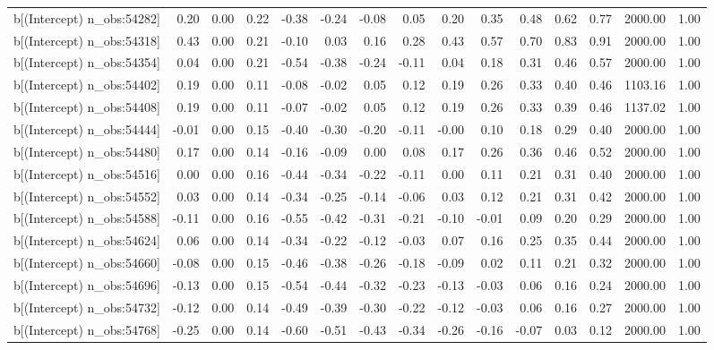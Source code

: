 \begin{table}[ht]
\begin{tabular}{rrrrrrrrrrrrrrr}
  b[(Intercept) n\_obs:54282] & 0.20 & 0.00 & 0.22 & -0.38 & -0.24 & -0.08 & 0.05 & 0.20 & 0.35 & 0.48 & 0.62 & 0.77 & 2000.00 & 1.00 \\ 
  b[(Intercept) n\_obs:54318] & 0.43 & 0.00 & 0.21 & -0.10 & 0.03 & 0.16 & 0.28 & 0.43 & 0.57 & 0.70 & 0.83 & 0.91 & 2000.00 & 1.00 \\ 
  b[(Intercept) n\_obs:54354] & 0.04 & 0.00 & 0.21 & -0.54 & -0.38 & -0.24 & -0.11 & 0.04 & 0.18 & 0.31 & 0.46 & 0.57 & 2000.00 & 1.00 \\ 
  b[(Intercept) n\_obs:54402] & 0.19 & 0.00 & 0.11 & -0.08 & -0.02 & 0.05 & 0.12 & 0.19 & 0.26 & 0.33 & 0.40 & 0.46 & 1103.16 & 1.00 \\ 
  b[(Intercept) n\_obs:54408] & 0.19 & 0.00 & 0.11 & -0.07 & -0.02 & 0.05 & 0.12 & 0.19 & 0.26 & 0.33 & 0.39 & 0.46 & 1137.02 & 1.00 \\ 
  b[(Intercept) n\_obs:54444] & -0.01 & 0.00 & 0.15 & -0.40 & -0.30 & -0.20 & -0.11 & -0.00 & 0.10 & 0.18 & 0.29 & 0.40 & 2000.00 & 1.00 \\ 
  b[(Intercept) n\_obs:54480] & 0.17 & 0.00 & 0.14 & -0.16 & -0.09 & 0.00 & 0.08 & 0.17 & 0.26 & 0.36 & 0.46 & 0.52 & 2000.00 & 1.00 \\ 
  b[(Intercept) n\_obs:54516] & 0.00 & 0.00 & 0.16 & -0.44 & -0.34 & -0.22 & -0.11 & 0.00 & 0.11 & 0.21 & 0.31 & 0.40 & 2000.00 & 1.00 \\ 
  b[(Intercept) n\_obs:54552] & 0.03 & 0.00 & 0.14 & -0.34 & -0.25 & -0.14 & -0.06 & 0.03 & 0.12 & 0.21 & 0.31 & 0.42 & 2000.00 & 1.00 \\ 
  b[(Intercept) n\_obs:54588] & -0.11 & 0.00 & 0.16 & -0.55 & -0.42 & -0.31 & -0.21 & -0.10 & -0.01 & 0.09 & 0.20 & 0.29 & 2000.00 & 1.00 \\ 
  b[(Intercept) n\_obs:54624] & 0.06 & 0.00 & 0.14 & -0.34 & -0.22 & -0.12 & -0.03 & 0.07 & 0.16 & 0.25 & 0.35 & 0.44 & 2000.00 & 1.00 \\ 
  b[(Intercept) n\_obs:54660] & -0.08 & 0.00 & 0.15 & -0.46 & -0.38 & -0.26 & -0.18 & -0.09 & 0.02 & 0.11 & 0.21 & 0.32 & 2000.00 & 1.00 \\ 
  b[(Intercept) n\_obs:54696] & -0.13 & 0.00 & 0.15 & -0.54 & -0.44 & -0.32 & -0.23 & -0.13 & -0.03 & 0.06 & 0.16 & 0.24 & 2000.00 & 1.00 \\ 
  b[(Intercept) n\_obs:54732] & -0.12 & 0.00 & 0.14 & -0.49 & -0.39 & -0.30 & -0.22 & -0.12 & -0.03 & 0.06 & 0.16 & 0.27 & 2000.00 & 1.00 \\ 
  b[(Intercept) n\_obs:54768] & -0.25 & 0.00 & 0.14 & -0.60 & -0.51 & -0.43 & -0.34 & -0.26 & -0.16 & -0.07 & 0.03 & 0.12 & 2000.00 & 1.00 \\ 

\end{tabular}
\end{table}
